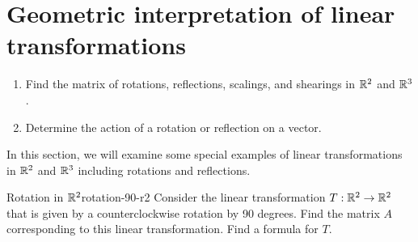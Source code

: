 \section{Geometric interpretation of linear transformations}

\begin{outcome}
  \begin{enumerate}
  \item Find the matrix of rotations, reflections, scalings, and
    shearings in $\mathbb{R}^2$ and $\mathbb{R}^3$.
  \item Determine the action of a rotation or reflection on a vector.
  \end{enumerate}
\end{outcome}

In this section, we will examine some special examples of linear
transformations in $\mathbb{R}^2$ and $\mathbb{R}^3$ including rotations and
reflections.

\begin{example}{Rotation in $\mathbb{R}^2$}{rotation-90-r2}
  Consider the linear transformation $T:\mathbb{R}^2\to\mathbb{R}^2$ that is given by
  a counterclockwise rotation by 90 degrees. Find the matrix $A$
  corresponding to this linear transformation. Find a formula for $T$.
\end{example}

